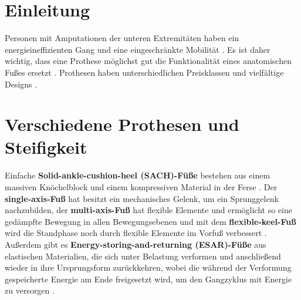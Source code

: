 \section{Einleitung}
Personen mit Amputationen der unteren Extremitäten haben ein energieineffizienten Gang und eine eingeschränkte Mobilität \cite{Major.2014}. Es ist daher wichtig, dass eine Prothese möglichst gut die Funktionalität eines anatomischen Fußes ersetzt \cite{Stevens.2018}. Prothesen haben unterschiedlichen Preisklassen und vielfältige Designs \cite{Stevens.2018}.


\section{Verschiedene Prothesen und Steifigkeit}  %
Einfache \textbf{Solid-ankle-cushion-heel (SACH)-Füße} bestehen aus einem massiven Knöchelblock und einem kompressiven Material in der Ferse \cite{Stevens.2018}. Der \textbf{single-axis-Fuß} hat besitzt ein mechanisches Gelenk, um ein Sprunggelenk nachzubilden, der \textbf{multi-axis-Fuß} hat flexible Elemente und ermöglicht so eine gedämpfte Bewegung in allen Bewegungsebenen und mit dem \textbf{flexible-keel-Fuß} wird die Standphase noch durch flexible Elemente im Vorfuß verbessert \cite{Stevens.2018}. 
Außerdem gibt es \textbf{Energy-storing-and-returning (ESAR)-Füße} aus elastischen Materialien, die sich unter Belastung verformen und anschließend wieder in ihre Ursprungsform zurückkehren, wobei die während der Verformung gespeicherte Energie am Ende freigesetzt wird, um den Gangzyklus mit Energie zu versorgen \cite{Stevens.2018}. %

